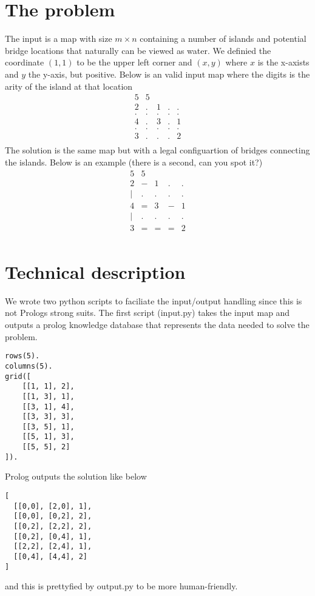 \documentclass[a4paper,12pt]{article}
\begin{document}
\section*{The problem}
The input is a map with size $m \times n$ containing a number of islands and potential bridge locations that naturally can be viewed as water. We definied the coordinate $(1,1)$ to be the upper left corner and $(x,y)$ where $x$ is the x-axists and $y$ the y-axis, but positive. Below is an valid input map where the digits is the arity of the island at that location
\[
    \begin{array}{lllll}
    5 & 5 \\
    2 & . & 1 & . & . \\
    . & . & . & . & . \\
    4 & . & 3 & . & 1 \\
    . & . & . & . & . \\
    3 & . & . & . & 2 \\
    \end{array}
\]
The solution is the same map but with a legal configuartion of bridges connecting the islands. Below is an example (there is a second, can you spot it?)
\[
    \begin{array}{lllll}
    5 & 5 \\
    2 & - & 1 & . & . \\
    | & . & . & . & . \\
    4 & = & 3 & - & 1 \\
    | & . & . & . & . \\
    3 & = & = & = & 2 \\
    \end{array}
\]

\section*{Technical description}
We wrote two python scripts to faciliate the input/output handling since this is not Prologs strong suits. The first script (input.py) takes the input map and outputs a prolog knowledge database that represents the data needed to solve the problem.
\begin{verbatim}
rows(5).
columns(5).
grid([
    [[1, 1], 2],
    [[1, 3], 1],
    [[3, 1], 4],
    [[3, 3], 3],
    [[3, 5], 1],
    [[5, 1], 3],
    [[5, 5], 2]
]).
\end{verbatim}
Prolog outputs the solution like below
\begin{verbatim}
[
  [[0,0], [2,0], 1],
  [[0,0], [0,2], 2],
  [[0,2], [2,2], 2],
  [[0,2], [0,4], 1],
  [[2,2], [2,4], 1],
  [[0,4], [4,4], 2]
]
\end{verbatim}
and this is prettyfied by output.py to be more human-friendly.
\end{document}
